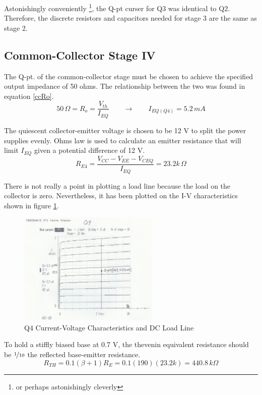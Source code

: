 \documentclass[titlepage, letterpaper, 11pt]{article}
\begin{document}
Astonishingly conveniently
\footnote{or perhaps astonishingly cleverly},
the Q-pt curser for Q3 was identical to Q2. Therefore, the discrete
resistors and capacitors needed for stage 3 are the same as stage 2.

\subsection{Common-Collector Stage IV}

The Q-pt. of the common-collector stage must be chosen to achieve the
specified output impedance of 50 ohms. The relationship between the
two was found in equation \ref{ccRo}.
\begin{equation*}
50\,\Omega=R_{o}=\frac{V_{th}}{I_{EQ}}
\qquad\rightarrow\qquad I_{EQ(Q4)}=5.2\,mA
\end{equation*}

The quiescent collector-emitter voltage is chosen to be 12 V to split
the power supplies evenly. Ohms law is used to calculate an emitter
resistance that will limit $I_{EQ}$ given a potential difference of
12 V.
\begin{equation*}
R_{E4}=\frac{V_{CC}-V_{EE}-V_{CEQ}}{I_{EQ}}=23.2k\,\Omega
\end{equation*}

There is not really a point in plotting a load line because the load
on the collector is zero. Nevertheless, it has been plotted on the
I-V characteristics shown in figure \ref{q4Characteristics}.

\begin{figure}[ht]
	\centering
	\includegraphics[width=0.6\textwidth]
		{measurements/q4Characteristics}
	\caption{
		Q4 Current-Voltage Characteristics and DC Load Line
	}
	\label{q4Characteristics}
\end{figure}

To hold a stiffly biased base at 0.7 V, the thevenin equivalent
resistance should be $\nicefrac{1}{10}$ the reflected base-emitter
resistance.
\begin{equation*}
R_{TH}=0.1(\beta+1)R_{E}=0.1(190)(23.2k)=440.8\,k\Omega
\end{equation*}
\end{document}
